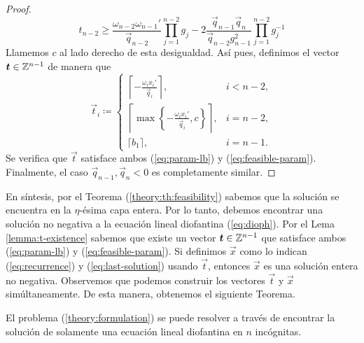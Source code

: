 \begin{proof}
	\begin{equation*}
		t_{n-2} \geq \frac{\omega_{n-2}\omega_{n-1}'}{\vec{q}_{n-2}}\prod_{j=1}^{n-2}g_j
		- 2\frac{\vec{q}_{n-1}\vec{q}_n}{\vec{q}_{n-2}g_{n-1}^2}
		\prod_{j=1}^{n-2}g_j^{-1}
	\end{equation*}
	Llamemos $c$ al lado derecho de esta desigualdad. Así pues, definimos el vector
	$\boldsymbol{t} \in \mathbb{Z}^{n-1}$ de manera que
	\begin{equation*}
		\vec{t}_i \coloneq \begin{cases}
			\left\lceil -\frac{\omega_i x_i'}{\vec{q}_i} \right\rceil, & i < n - 2, \\[1em]
			\left\lceil \max\left\lbrace -\frac{\omega_ix_i'}{\vec{q}_i}, c \right\rbrace
			\right\rceil, & i = n -2, \\[0.8em]
			\lceil b_1 \rceil, & i = n - 1.
		\end{cases}
	\end{equation*}
	Se verifica que $\vec{t}$ satisface ambos (\ref{eq:param-lb}) y (\ref{eq:feasible-param}).
	Finalmente, el caso $\vec{q}_{n-1}, \vec{q}_n < 0$ es completamente similar.
\end{proof}

En síntesis, por el Teorema (\ref{theory:th:feasibility}) sabemos que la solución se encuentra en
la $\eta$-ésima capa entera. Por lo tanto, debemos encontrar una solución no negativa a la ecuación
lineal diofantina (\ref{eq:dioph}). Por el Lema \ref{lemma:t-existence} sabemos que existe un vector
$\boldsymbol{t} \in \mathbb{Z}^{n-1}$ que satisface ambos (\ref{eq:param-lb}) y (\ref{eq:feasible-param}). Si
definimos $\vec{x}$ como lo indican (\ref{eq:recurrence}) y (\ref{eq:last-solution}) usando
$\vec{t}$, entonces $\vec{x}$ es una solución entera no negativa. Observemos que podemos construir
los vectores $\vec{t}$ y $\vec{x}$ simúltaneamente. De esta manera, obtenemos el siguiente Teorema.

\begin{theorem}
	El problema (\ref{theory:formulation}) se puede resolver a través de encontrar la solución de
	solamente una ecuación lineal diofantina en $n$ incógnitas.
\end{theorem}

